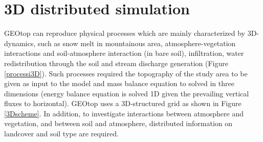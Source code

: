 \clearpage
\section{3D distributed simulation}
GEOtop can reproduce physical processes which are mainly characterized by 3D-dynamics, such as snow melt in  mountainous area, atmosphere-vegetation interactions and soil-atmosphere interaction (in bare soil), infiltration, water redistribution through the soil and stream discharge generation (Figure \ref{processi3D}). Such processes required the topography of the study area to be given as input to the model and mass balance equation to solved in three dimensions (energy balance equation is solved 1D given the prevailing vertical fluxes to horizontal). GEOtop uses a 3D-structured grid as shown in Figure \ref{3Dscheme}.
In addition, to investigate interactions between atmosphere and vegetation, and between soil and atmosphere, distributed information on landcover and soil type are required. 

